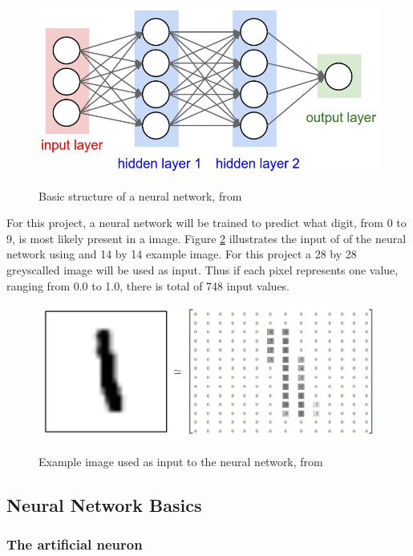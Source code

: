 \begin{figure}
  \centering
  \includegraphics[width=14cm]{NN}\\
  \caption{Basic structure of a neural network, from \citet{karpathy2017}}%
  \label{fig:nn}
\end{figure}

For this project, a neural network will be trained to predict what digit, from 0 to 9, is most likely present in a image.  Figure \ref{fig:mnist} illustrates the input of of the neural network using and 14 by 14 example image. For this project a 28 by 28 greyscalled image will be used as input. Thus if each pixel represents one value, ranging from 0.0 to 1.0, there is total of 748 input values. 

\begin{figure}
  \centering
  \includegraphics[width=14cm]{MNIST}\\
  \caption{Example image used as input to the neural network, from \citet{tensor2017}}
  \label{fig:mnist}
\end{figure}

\subsection{Neural Network Basics}

\subsubsection{The artificial neuron}

